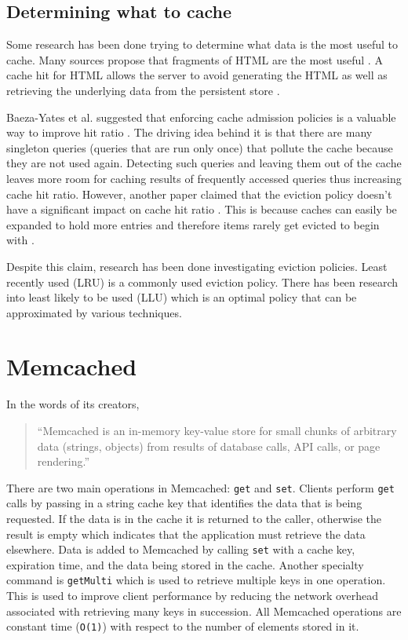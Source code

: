 \documentclass[12pt]{ucthesis}
\begin{document}
\subsection{Determining what to cache}
Some research has been done trying to determine what data is the most useful to cache.
Many sources propose that fragments of HTML are the most useful \cite{comparisonOfCachingSolutions, scalableConsistentCaching}.
A cache hit for HTML allows the server to avoid generating the HTML as well as retrieving the underlying data from the persistent store \cite{howBasecampGotSoFast}.

Baeza-Yates et al. suggested that enforcing cache admission policies is a valuable way to improve hit ratio \cite{cacheAdmissionPolicies}.
The driving idea behind it is that there are many singleton queries (queries that are run only once) that pollute the cache because they are not used again.
Detecting such queries and leaving them out of the cache leaves more room for caching results of frequently accessed queries thus increasing cache hit ratio.
However, another paper claimed that the eviction policy doesn't have a significant impact on cache hit ratio \cite{refreshingPerspectiveSearch}.
This is because caches can easily be expanded to hold more entries and therefore items rarely get evicted to begin with \cite{refreshingPerspectiveSearch}.

Despite this claim, research has been done investigating eviction policies.
Least recently used (LRU) is a commonly used eviction policy.
There has been research into least likely to be used (LLU) which is an optimal policy that can be approximated by various techniques.


\section{Memcached}
In the words of its creators, \begin{quotation}``Memcached is an in-memory key-value store for small chunks of arbitrary data (strings, objects) from results of database calls, API calls, or page rendering.\cite{memcachedDotOrg}''\end{quotation}
There are two main operations in {\textsf Memcached}: {\tt get} and {\tt set}.
Clients perform {\tt get} calls by passing in a string cache key that identifies the data that is being requested.
If the data is in the cache it is returned to the caller, otherwise the result is empty which indicates that the application must retrieve the data elsewhere.
Data is added to {\textsf Memcached} by calling {\tt set} with a cache key, expiration time, and the data being stored in the cache.
Another specialty command is {\tt getMulti} which is used to retrieve multiple keys in one operation.
This is used to improve client performance by reducing the network overhead associated with retrieving many keys in succession.
All {\textsf Memcached} operations are constant time ({\tt O(1)}) with respect to the number of elements stored in it.
\end{document}
